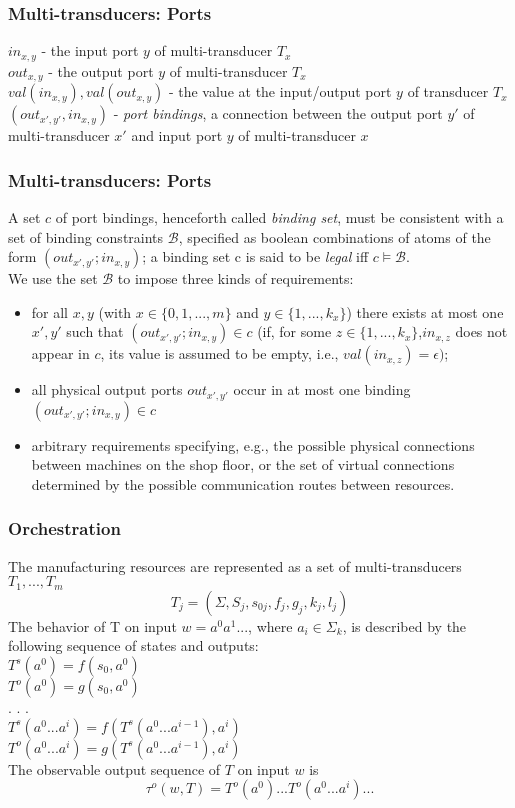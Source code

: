 \documentclass{beamer}
\theoremstyle{definition}
\theoremstyle{plain}
\begin{document}
\begin{frame}
\frametitle{Multi-transducers: Ports}
$ in_{x, y} $ - the input port $y$ of multi-transducer $T_{x}$\\
$ out_{x, y} $ - the output port $y$ of multi-transducer $T_{x}$\\
$ val(in_{x,y}), val(out_{x,y})$ - the value at the input/output port $y$ of transducer $T_{x}$\\
$ (out_{x', y'}, in_{x, y})$ - \textit{port bindings}, a connection between the output port $y'$ of multi-transducer $x'$ and input port $y$ of multi-transducer $x$\\
\end{frame}

\begin{frame}
\frametitle{Multi-transducers: Ports}
A set $c$ of port bindings, henceforth called \textit{binding set}, must be consistent with a set of binding constraints $\mathcal{B}$, specified as boolean combinations of atoms of the form $ (out_{x', y'}; in_{x, y})$; a binding set c is said to be \textit{legal} iff $c \models \mathcal{B}$.\\
We use the set $\mathcal{B}$ to impose three kinds of requirements: \\
\begin{itemize}
\item for all $x, y$ (with $x \in \{0, 1, . . . , m\}$ and $y \in \{1, . . . ,k_{x}\}$) there exists at most one $x', y'$ such that $ (out_{x', y'}; in_{x, y}) \in c$ (if, for some $z \in \{1, . . . , k_{x}\}$,$ in_{x,z}$ does not appear in $c$, its value is assumed to be empty, i.e., $val(in_{x,z}) = \epsilon)$;
\item all physical output ports $out_{x', y'}$ occur in at most one binding $ (out_{x', y'}; in_{x, y}) \in c$
\item arbitrary requirements specifying, e.g., the possible physical connections between machines on the shop floor, or the set of virtual connections determined by the possible communication routes between resources.
\end{itemize}
\end{frame}

\begin{frame}
\frametitle{Orchestration}
The manufacturing resources are represented as a set of multi-transducers $T_{1}, . . . , T_{m}$\\
$$T_{j} = (\Sigma, S_{j}, s_{0j}, f_{j}, g_{j}, k_{j}, l_{j})$$
The behavior of T on input $w = a^{0}a^{1}. . . $, where $a_{i} \in \Sigma_{k}$, is described by the following sequence of states and outputs:\\
$T^{s}(a^{0}) = f(s_{0}, a^{0})$\\
$T^{o}(a^{0}) = g(s_{0}, a^{0})$\\
. . .\\
$T^{s}(a^{0} . . . a^{i}) = f(T^{s}(a^{0} . . . a^{i-1}), a^{i})$\\
$T^{o}(a^{0} . . . a^{i}) = g(T^{s}(a^{0} . . . a^{i-1}), a^{i})$\\
The observable output sequence of $T$ on input $w$ is
$$\tau^{o}(w, T) = T^{o}(a^{0}) . . . T^{o}(a^{0} . . . a^{i}) . . .$$
\end{frame}
\end{document}
